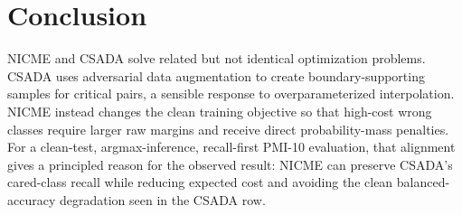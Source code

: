 \documentclass[11pt]{article}
\theoremstyle{definition}
\theoremstyle{plain}
\theoremstyle{remark}
\begin{document}
\section{Conclusion}

NICME and CSADA solve related but not identical optimization problems.
CSADA uses adversarial data augmentation to create boundary-supporting samples for critical pairs, a sensible response to overparameterized interpolation.
NICME instead changes the clean training objective so that high-cost wrong classes require larger raw margins and receive direct probability-mass penalties.
For a clean-test, argmax-inference, recall-first PMI-10 evaluation, that alignment gives a principled reason for the observed result:
NICME can preserve CSADA's cared-class recall while reducing expected cost and avoiding the clean balanced-accuracy degradation seen in the CSADA row.
\end{document}
